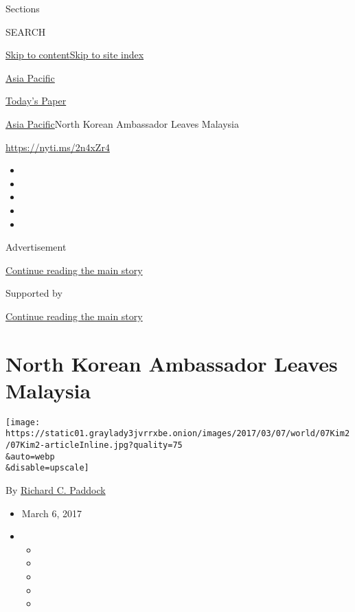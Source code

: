 Sections

SEARCH

\protect\hyperlink{site-content}{Skip to
content}\protect\hyperlink{site-index}{Skip to site index}

\href{https://www.nytimes3xbfgragh.onion/section/world/asia}{Asia
Pacific}

\href{https://myaccount.nytimes3xbfgragh.onion/auth/login?response_type=cookie\&client_id=vi}{}

\href{https://www.nytimes3xbfgragh.onion/section/todayspaper}{Today's
Paper}

\href{/section/world/asia}{Asia Pacific}\textbar{}North Korean
Ambassador Leaves Malaysia

\url{https://nyti.ms/2n4xZr4}

\begin{itemize}
\item
\item
\item
\item
\item
\end{itemize}

Advertisement

\protect\hyperlink{after-top}{Continue reading the main story}

Supported by

\protect\hyperlink{after-sponsor}{Continue reading the main story}

\hypertarget{north-korean-ambassador-leaves-malaysia}{%
\section{North Korean Ambassador Leaves
Malaysia}\label{north-korean-ambassador-leaves-malaysia}}

\texttt{[image: https://static01.graylady3jvrrxbe.onion/images/2017/03/07/world/07Kim2/07Kim2-articleInline.jpg?quality=75\\\&auto=webp\\\&disable=upscale]}

By
\href{https://www.nytimes3xbfgragh.onion/by/richard-c-paddock}{Richard
C. Paddock}

\begin{itemize}
\item
  March 6, 2017
\item
  \begin{itemize}
  \item
  \item
  \item
  \item
  \item
  \end{itemize}
\end{itemize}

